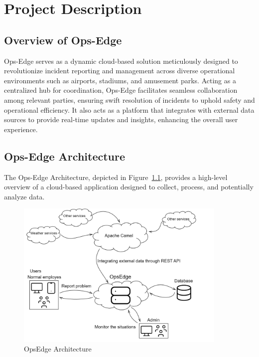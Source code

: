 \chapter{Project Description}
\label{ch:project_description}

\section{Overview of Ops-Edge}
\label{sec:project_description:overview}
Ops-Edge serves as a dynamic cloud-based solution meticulously designed to revolutionize incident reporting and management across diverse operational environments such as airports, stadiums, and amusement parks. Acting as a centralized hub for coordination, Ops-Edge facilitates seamless collaboration among relevant parties, ensuring swift resolution of incidents to uphold safety and operational efficiency. It also acts as a platform that integrates with external data sources to provide real-time updates and insights, enhancing the overall user experience.

\section{Ops-Edge Architecture}
\label{sec:project_description:opsedge_architecture}

The Ops-Edge Architecture, depicted in Figure~\ref{fig:opsedge_architecture}, provides a high-level overview of a cloud-based application designed to collect, process, and potentially analyze data.

\begin{figure}[h]
    \centering
    \includegraphics[width=0.9\textwidth]{gfx/opsedge-architecture.png}
    \caption{OpsEdge Architecture}
    \label{fig:opsedge_architecture}
\end{figure}

